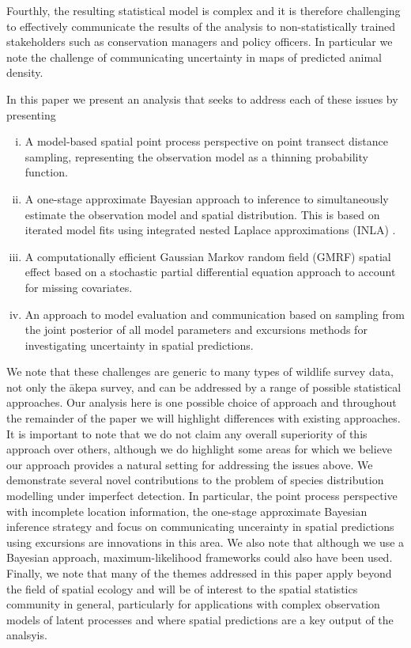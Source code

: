 \documentclass[preprint,12pt]{elsarticle}
\newcommand{\akepa}{\textquotesingle\={a}kepa}  %
\begin{document}
Fourthly, the resulting statistical model is complex and it is therefore challenging to effectively communicate the results of the analysis to non-statistically trained stakeholders such as conservation managers and policy officers.  In particular we note the challenge of communicating uncertainty in maps of predicted animal density.

In this paper we present an analysis that seeks to address each of these issues by presenting

\begin{enumerate}[(i)]
	\item A model-based spatial point process perspective on point transect distance sampling, representing the observation model as a thinning probability function.
	\item A one-stage approximate Bayesian approach to inference to simultaneously estimate the observation model and spatial distribution.  This is based on iterated model fits using integrated nested Laplace approximations (INLA) \citep{rue_approximate_2009}.
	\item A computationally efficient Gaussian Markov random field (GMRF) spatial effect based on a stochastic partial differential equation approach \citep{lindgren_explicit_2011} to account for missing covariates.
	\item An approach to model evaluation and communication based on sampling from the joint posterior of all model parameters and excursions methods \citep{bolin_excursion_2015} for investigating uncertainty in spatial predictions.
\end{enumerate}

We note that these challenges are generic to many types of wildlife survey data, not only the \akepa{} survey, and can be addressed by a range of possible statistical approaches.  Our analysis here is one possible choice of approach and throughout the remainder of the paper we will highlight differences with existing approaches. It is important to note that we do not claim any overall superiority of this approach over others, although we do highlight some areas for which we believe our approach provides a natural setting for addressing the issues above.  We demonstrate several novel contributions to the problem of species distribution modelling under imperfect detection.  In particular, the point process perspective with incomplete location information, the one-stage approximate Bayesian inference strategy and focus on communicating uncerainty in spatial predictions using excursions are innovations in this area.  We also note that although we use a Bayesian approach, maximum-likelihood frameworks could also have been used.  Finally, we note that many of the themes addressed in this paper apply beyond the field of spatial ecology and will be of interest to the spatial statistics community in general, particularly for applications with complex observation models of latent processes and where spatial predictions are a key output of the analsyis.
\end{document}
